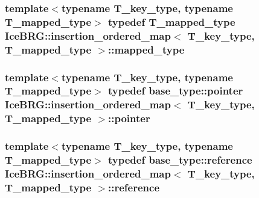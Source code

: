 \subsubsection[{mapped\+\_\+type}]{\setlength{\rightskip}{0pt plus 5cm}template$<$typename T\+\_\+key\+\_\+type, typename T\+\_\+mapped\+\_\+type$>$ typedef T\+\_\+mapped\+\_\+type {\bf Ice\+B\+R\+G\+::insertion\+\_\+ordered\+\_\+map}$<$ T\+\_\+key\+\_\+type, T\+\_\+mapped\+\_\+type $>$\+::{\bf mapped\+\_\+type}}\label{classIceBRG_1_1insertion__ordered__map_a4ab99f9f37138d3239735b5ff4aac2e5}
\hypertarget{classIceBRG_1_1insertion__ordered__map_a55d30074a56e43059e08952287eec04a}{}
\subsubsection[{pointer}]{\setlength{\rightskip}{0pt plus 5cm}template$<$typename T\+\_\+key\+\_\+type, typename T\+\_\+mapped\+\_\+type$>$ typedef base\+\_\+type\+::pointer {\bf Ice\+B\+R\+G\+::insertion\+\_\+ordered\+\_\+map}$<$ T\+\_\+key\+\_\+type, T\+\_\+mapped\+\_\+type $>$\+::{\bf pointer}}\label{classIceBRG_1_1insertion__ordered__map_a55d30074a56e43059e08952287eec04a}
\hypertarget{classIceBRG_1_1insertion__ordered__map_a22138af723d72d95d476af6baae7c130}{}
\subsubsection[{reference}]{\setlength{\rightskip}{0pt plus 5cm}template$<$typename T\+\_\+key\+\_\+type, typename T\+\_\+mapped\+\_\+type$>$ typedef base\+\_\+type\+::reference {\bf Ice\+B\+R\+G\+::insertion\+\_\+ordered\+\_\+map}$<$ T\+\_\+key\+\_\+type, T\+\_\+mapped\+\_\+type $>$\+::{\bf reference}}\label{classIceBRG_1_1insertion__ordered__map_a22138af723d72d95d476af6baae7c130}
\hypertarget{classIceBRG_1_1insertion__ordered__map_ae040bd2bd5e69ae6288849f97d666a24}{}
